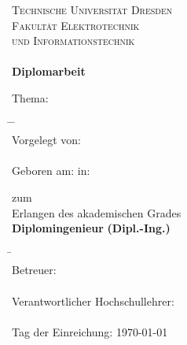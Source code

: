 
\thispagestyle{empty}
\begin{center}
 \textsc{\huge Technische Universität Dresden} \\
 \vspace{5mm}
 \textsc{\huge Fakultät Elektrotechnik} \\
 \vspace{5mm}
 \textsc{\huge und Informationstechnik} \\
 \vspace{5mm}
 {\Large\institut} \\
 \vspace{15mm}
 \textbf{\Huge Diplomarbeit}
\end{center}
\vspace{5mm}

Thema:
\begin{center}
	\textbf{\large\thema}
\end{center}
\vspace{8mm} %
\begin{tabbing}
	\hspace{3cm} \= \hspace{5cm} \= \kill \\
	Vorgelegt von:\>\vorname~\nachname \\ \\
	Geboren am:\>\geburtsdatum \> in:\hspace{7mm} \geburtsort
\end{tabbing}

\vspace{5mm}

\begin{center}
 zum \\
 Erlangen des akademischen Grades \\
 \vspace{8mm} %
 \textbf{\Huge Diplomingenieur}
 \textbf{(Dipl.-Ing.)}
\end{center}

\vspace{1cm}
\begin{tabbing}
	\hspace{8cm} \= \kill \\
	Betreuer:\>\betreuer \\ \\
	Verantwortlicher Hochschullehrer:\>\hslehrer \\ \\
	Tag der Einreichung:\> \today \\ \\
\end{tabbing}